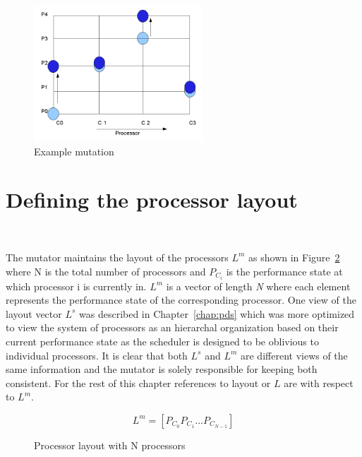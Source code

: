 \begin{figure}[h!]
  \begin{center}
    \includegraphics[height=2in]{figures/example_mutation_3.png}%
    \caption{Example mutation}
    \label{fig:ex_mutation}
  \end{center}
\end{figure}


\section{Defining the processor layout}~\label{sec:layout}

The mutator maintains the layout of the processors $L^m$ as shown in Figure~\ref{fig:mutator_layout_view}
where N is the total number of processors and 
$P_{C_{i}}$ is the performance state at which processor i is currently in. $L^m$
is a vector of length \textit{N} where each element represents the performance state
of the corresponding processor. 
One view of the layout vector $L^s$ was described in Chapter~\ref{chap:pds} 
which was more optimized to view the system of processors as an hierarchal organization
based on their current performance state as the scheduler is designed to be oblivious to individual processors. 
It is clear that both $L^s$ and $L^m$ are
different views of the same information and 
the mutator is solely responsible for keeping both consistent. For the rest of this chapter
references to layout or $L$ are with respect to $L^m$. 

\begin{figure}[h!]
\centering
\begin{equation*}
    L^m = [ P_{C_{0}} P_{C_{1}} ... P_{C_{N-1}} ]
\end{equation*}
\caption{Processor layout with N processors}
\label{fig:mutator_layout_view}
\end{figure}

